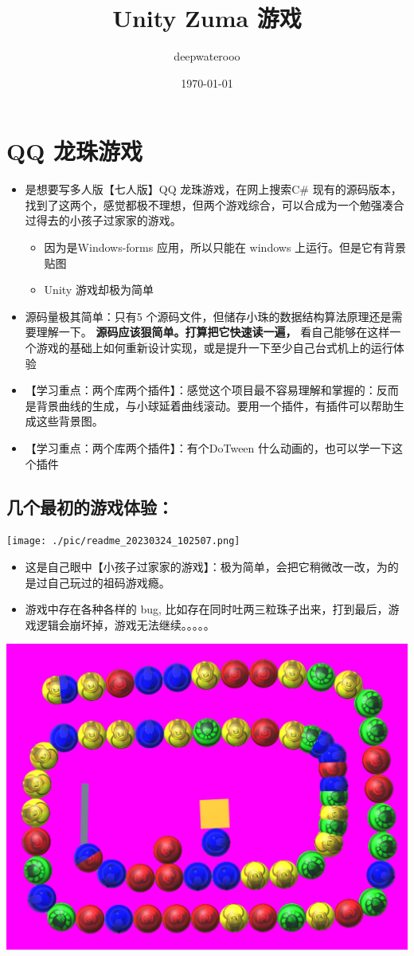 \documentclass[9pt, b5paper]{article}
\author{deepwaterooo}
\date{\today}
\title{Unity Zuma 游戏}
\begin{document}
\maketitle
\tableofcontents


\section{QQ 龙珠游戏}
\label{sec-1}
\begin{itemize}
\item 是想要写多人版【七人版】QQ 龙珠游戏，在网上搜索C\# 现有的源码版本，找到了这两个，感觉都极不理想，但两个游戏综合，可以合成为一个勉强凑合过得去的小孩子过家家的游戏。
\begin{itemize}
\item 因为是Windows-forms 应用，所以只能在 windows 上运行。但是它有背景贴图
\item Unity 游戏却极为简单
\end{itemize}
\item 源码量极其简单：只有5 个源码文件，但储存小珠的数据结构算法原理还是需要理解一下。 \textbf{源码应该狠简单。打算把它快速读一遍，} 看自己能够在这样一个游戏的基础上如何重新设计实现，或是提升一下至少自己台式机上的运行体验
\item 【学习重点：两个库两个插件】：感觉这个项目最不容易理解和掌握的：反而是背景曲线的生成，与小球延着曲线滚动。要用一个插件，有插件可以帮助生成这些背景图。
\item 【学习重点：两个库两个插件】：有个DoTween 什么动画的，也可以学一下这个插件
\end{itemize}
\subsection{几个最初的游戏体验：}
\label{sec-1-1}

\texttt{[image: ./pic/readme\_20230324\_102507.png]}
\begin{itemize}
\item 这是自己眼中【小孩子过家家的游戏】：极为简单，会把它稍微改一改，为的是过自己玩过的祖码游戏瘾。
\item 游戏中存在各种各样的 bug, 比如存在同时吐两三粒珠子出来，打到最后，游戏逻辑会崩坏掉，游戏无法继续。。。。。
\end{itemize}

\includegraphics[width=.9\linewidth]{./pic/readme_20230323_112732.png}
\end{document}
